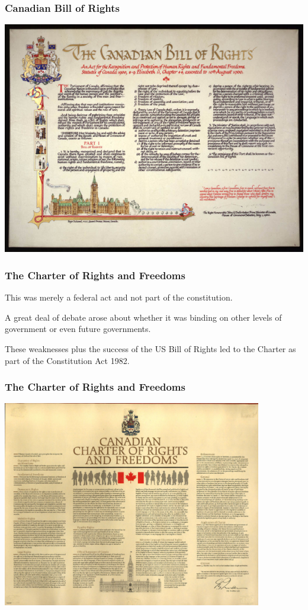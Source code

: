 \begin{frame}
\frametitle{Canadian Bill of Rights}

\begin{center}
	\includegraphics{images/canadian-bill-of-rights.png}
\end{center}

\end{frame}



\begin{frame}
\frametitle{The Charter of Rights and Freedoms}
This was merely a federal act and not part of the constitution.

A great deal of debate arose about whether it was binding on other levels of government or even future governments.

These weaknesses plus the success of the US Bill of Rights led to the Charter as part of the Constitution Act 1982.

\end{frame}



\begin{frame}
\frametitle{The Charter of Rights and Freedoms}

\begin{center}
\includegraphics[width=0.85\textwidth]{images/charter.jpeg}
\end{center}

\end{frame}


